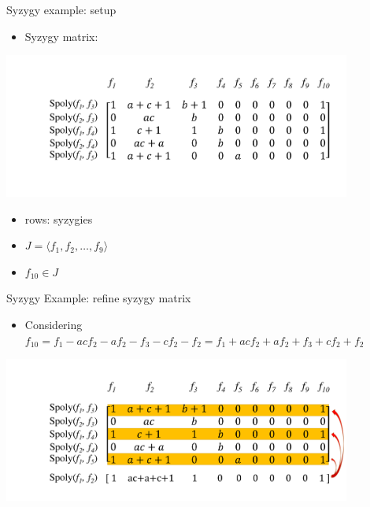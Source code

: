 \documentclass[xcolor=dvipsnames]{beamer}
\newcommand{\bi}{\begin{itemize}}
\newcommand{\ei}{\end{itemize}}
\begin{document}
\begin{frame}{\large{Syzygy example: setup}}
\bi
\item Syzygy matrix:
\ei
\includegraphics[width=4.5in]{./syzygy_1.pdf}
\pause
{}
\bi
\item rows: syzygies
\item $J = \langle f_1,f_2,\dots,f_9\rangle$
\item $f_{10}\in J$
\ei
\end{frame}
\begin{frame}{\large{Syzygy Example: refine syzygy matrix}}
\bi
\item Considering $f_{10}=f_1-acf_2-af_2-f_3-cf_2-f_2 = f_1+acf_2+af_2+f_3+cf_2+f_2$
\ei
\includegraphics[width=4.5in]{./syzygy_3.pdf}
\end{frame}
\end{document}
